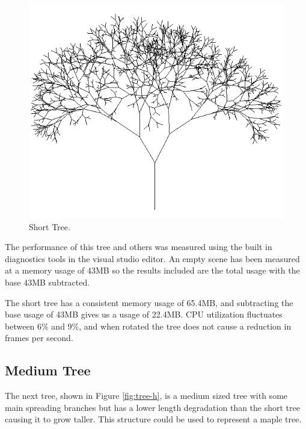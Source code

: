 \documentclass[final]{cmpreport}
\begin{document}
\begin{figure}[ht]
    \includegraphics[scale=0.7]{tree-g.PNG} 
    \centering
    \captionsetup{justification=centering}
    \caption{Short Tree.}
    \label{fig:tree-g}
\end{figure}

The performance of this tree and others was measured using the built in diagnostics tools in 
the visual studio editor. An empty scene has been measured at a memory usage of 43MB so the 
results included are the total usage with the base 43MB subtracted. 

The short tree has a consistent memory usage of 65.4MB, and subtracting the base usage of 43MB gives 
us a usage of 22.4MB. CPU utilization fluctuates between 6\% and 9\%, and when rotated the tree 
does not cause a reduction in frames per second.

\subsection{Medium Tree}
The next tree, shown in Figure \ref{fig:tree-h}, is a medium sized tree with some main spreading 
branches but has a lower length degradation than the short tree causing it to grow taller. This 
structure could be used to represent a maple tree.
\end{document}
